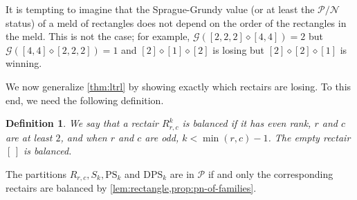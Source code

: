 \documentclass[pdflatex,sn-mathphys-num]{sn-jnl}%
\theoremstyle{thmstyleone}%
\theoremstyle{thmstyletwo}%
\theoremstyle{thmstylethree}%
\newtheorem{definition}{Definition}%
\newcommand{\p}{\mathcal P}
\newcommand{\n}{\mathcal N}
\newcommand{\sg}{\mathcal{G}}
\newcommand{\dps}{\mathrm{DPS}}
\newcommand{\ps}{\mathrm{PS}}
\begin{document}
It is tempting to imagine that the Sprague-Grundy value (or at least the $\p/\n$ status) of a meld of rectangles does not depend on the order of the rectangles in the meld. 
This is not the case; for example, $\sg([2,2,2] \diamond [4,4]) = 2$ but $\sg([4,4] \diamond [2,2,2]) = 1$ and $[2] \diamond [1] \diamond [2]$ is losing but $[2] \diamond [2]\diamond [1]$ is winning. 





We now generalize \cref{thm:ltrl} by showing exactly which rectairs are losing. To this end, we need the following definition.

\begin{definition}
    We say that a rectair $R^k_{r, c}$ is \emph{balanced} if it has even rank, $r$ and $c$ are at least $2$, and when $r$ and $c$ are odd, $k < \min(r, c) -1$. The empty rectair $[ \, ]$ is balanced. 
\end{definition}
The partitions $R_{r,c}, S_k, \ps_k$ and $\dps_k$ are in $\p$ if and only the corresponding rectairs are balanced by \cref{lem:rectangle,prop:pn-of-families}. 
\end{document}
